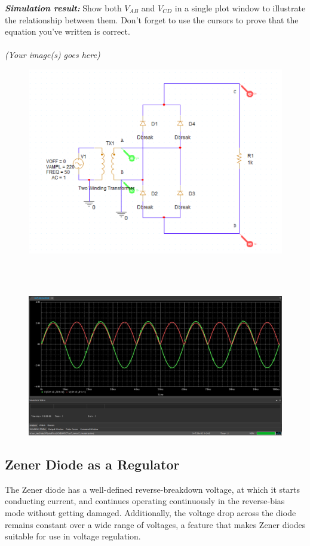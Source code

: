 \textbf{\textit{Simulation result:}}
Show both $V_{AB}$ and $V_{CD}$ in a single plot window to illustrate the relationship between them. Don't forget to use the cursors to prove that the equation you've written is correct.\\
\\
\textit{(Your image(s) goes here)}\\
\begin{figure}[H]
    \centering
    \includegraphics[width=500px]{source/picture/bai_2/ex7_sim.png}
\end{figure}

\\
\\
\begin{figure}[H]
    \centering
    \includegraphics[width=500px]{source/picture/bai_2/ex7_plot.png}
\end{figure}
\newpage

\subsection{Zener Diode as a Regulator}
The Zener diode has a well-defined reverse-breakdown voltage, at which it starts conducting current, and continues operating continuously in the reverse-bias mode without getting damaged. Additionally, the voltage drop across the diode remains constant over a wide range of voltages, a feature that makes Zener diodes suitable for use in voltage regulation.

